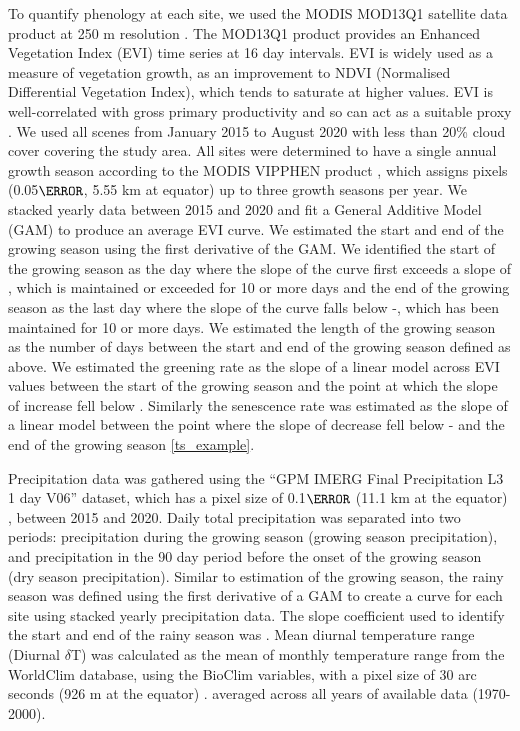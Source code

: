 \documentclass[11pt,a4paper]{article}
\begin{document}
To quantify phenology at each site, we used the MODIS MOD13Q1 satellite data product at 250 m resolution \citep{MOD13Q1}. The MOD13Q1 product provides an Enhanced Vegetation Index (EVI) time series at 16 day intervals. EVI is widely used as a measure of vegetation growth, as an improvement to NDVI (Normalised Differential Vegetation Index), which tends to saturate at higher values. EVI is well-correlated with gross primary productivity and so can act as a suitable proxy \citep{}. We used all scenes from January 2015 to August 2020 with less than 20\% cloud cover covering the study area. All sites were determined to have a single annual growth season according to the MODIS VIPPHEN product \citep{}, which assigns pixels (0.05$\degree$, 5.55 km at equator) up to three growth seasons per year. We stacked yearly data between 2015 and 2020 and fit a General Additive Model (GAM) to produce an average EVI curve. We estimated the start and end of the growing season using the first derivative of the GAM. We identified the start of the growing season as the day where the slope of the curve first exceeds a slope of \modisSLC{}, which is maintained or exceeded for 10 or more days and the end of the growing season as the last day where the slope of the curve falls below -\modisSLC{}, which has been maintained for 10 or more days. We estimated the length of the growing season as the number of days between the start and end of the growing season defined as above. We estimated the greening rate as the slope of a linear model across EVI values between the start of the growing season and the point at which the slope of increase fell below \modisSLC{}. Similarly the senescence rate was estimated as the slope of a linear model between the point where the slope of decrease fell below -\modisSLC{} and the end of the growing season \autoref{ts_example}.

Precipitation data was gathered using the ``GPM IMERG Final Precipitation L3 1 day V06'' dataset, which has a pixel size of 0.1$\degree$ (11.1 km at the equator) \citep{GPM}, between 2015 and 2020. Daily total precipitation was separated into two periods: precipitation during the growing season (growing season precipitation), and precipitation in the 90 day period before the onset of the growing season (dry season precipitation). Similar to estimation of the growing season, the rainy season was defined using the first derivative of a GAM to create a curve for each site using stacked yearly precipitation data. The slope coefficient used to identify the start and end of the rainy season was \trmmSLC{}. Mean diurnal temperature range (Diurnal $\delta$T) was calculated as the mean of monthly temperature range from the WorldClim database, using the BioClim variables, with a pixel size of 30 arc seconds (926 m at the equator) \citep{Fick2017}. averaged across all years of available data (1970-2000).
\end{document}
